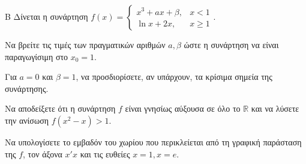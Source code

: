 \begin{thema}{Β}
Δίνεται η συνάρτηση $f(x) = \begin{cases} x^3 + ax + \beta, & x < 1 \\ \ln x + 2x, & x \ge 1 \end{cases}$.
\begin{erwthma}
  \item Να βρείτε τις τιμές των πραγματικών αριθμών $a, \beta$ ώστε η συνάρτηση να είναι παραγωγίσιμη στο $x_0=1$.
  \item Για $a = 0$ και $\beta = 1$, να προσδιορίσετε, αν υπάρχουν, τα κρίσιμα σημεία της συνάρτησης.
  \item Να αποδείξετε ότι η συνάρτηση $f$ είναι γνησίως αύξουσα σε όλο το $\mathbb{R}$ και να λύσετε την ανίσωση $f(x^2 - x) > 1$.
  \item Να υπολογίσετε το εμβαδόν του χωρίου που περικλείεται από τη γραφική παράσταση της $f$, τον άξονα $x'x$ και τις ευθείες $x=1, x=e$.
\end{erwthma}
\end{thema}
